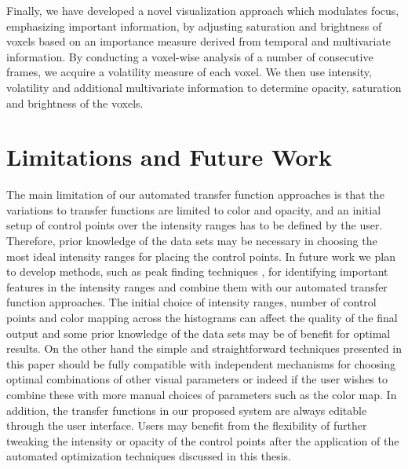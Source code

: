 Finally, we have developed a novel visualization approach which modulates focus, emphasizing important information, by adjusting saturation and brightness of voxels based on an importance measure derived from temporal and multivariate information.
By conducting a voxel-wise analysis of a number of consecutive frames, we acquire a volatility measure of each voxel. We then use intensity, volatility and additional multivariate information to determine opacity, saturation and brightness of the voxels.

\section{Limitations and Future Work}
The main limitation of our automated transfer function approaches is that the variations to transfer functions are limited to color and opacity, and an initial setup of control points over the intensity ranges has to be defined by the user. Therefore, prior knowledge of the data sets may be necessary in choosing the most ideal intensity ranges for placing the control points. In future work we plan to develop methods, such as peak finding techniques \cite{knoll_volume_2009} \cite{kotava_volume_2012}, for identifying important features in the intensity ranges and combine them with our automated transfer function approaches.
The initial choice of intensity ranges, number of control points and color mapping across the histograms can affect the quality of the final output and some prior knowledge of the data sets may be of benefit for optimal results. On the other hand the simple and straightforward techniques presented in this paper should be fully compatible with independent mechanisms for choosing optimal combinations of other visual parameters or indeed if the user wishes to combine these with more manual choices of parameters such as the color map.
In addition, the transfer functions in our proposed system are always editable through the user interface. Users may benefit from the flexibility of further tweaking the intensity or opacity of the control points after the application of the automated optimization techniques discussed in this thesis.

